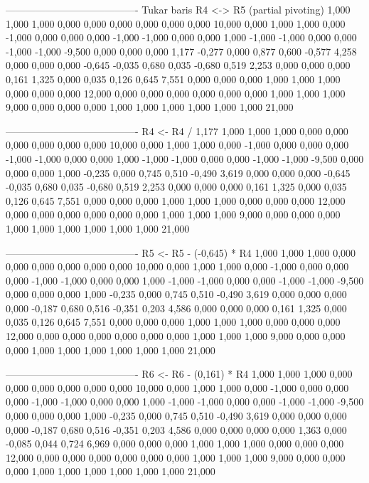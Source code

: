 \documentclass[12pt]{article}
\begin{document}
\begin{enumerate}
\begin{keluaran}
----------------------------------------
Tukar baris R4 <-> R5 (partial pivoting)
1,000   1,000   1,000   0,000   0,000   0,000   0,000   0,000   0,000   10,000
0,000   1,000   1,000   0,000   -1,000  0,000   0,000   0,000   -1,000  -1,000
0,000   0,000   1,000   -1,000  -1,000  0,000   0,000   -1,000  -1,000  -9,500
0,000   0,000   0,000   1,177   -0,277  0,000   0,877   0,600   -0,577  4,258
0,000   0,000   0,000   -0,645  -0,035  0,680   0,035   -0,680  0,519   2,253
0,000   0,000   0,000   0,161   1,325   0,000   0,035   0,126   0,645   7,551
0,000   0,000   0,000   1,000   1,000   1,000   0,000   0,000   0,000   12,000
0,000   0,000   0,000   0,000   0,000   0,000   1,000   1,000   1,000   9,000
0,000   0,000   0,000   1,000   1,000   1,000   1,000   1,000   1,000   21,000

----------------------------------------
R4 <- R4 / 1,177
1,000   1,000   1,000   0,000   0,000   0,000   0,000   0,000   0,000   10,000
0,000   1,000   1,000   0,000   -1,000  0,000   0,000   0,000   -1,000  -1,000
0,000   0,000   1,000   -1,000  -1,000  0,000   0,000   -1,000  -1,000  -9,500
0,000   0,000   0,000   1,000   -0,235  0,000   0,745   0,510   -0,490  3,619
0,000   0,000   0,000   -0,645  -0,035  0,680   0,035   -0,680  0,519   2,253
0,000   0,000   0,000   0,161   1,325   0,000   0,035   0,126   0,645   7,551
0,000   0,000   0,000   1,000   1,000   1,000   0,000   0,000   0,000   12,000
0,000   0,000   0,000   0,000   0,000   0,000   1,000   1,000   1,000   9,000
0,000   0,000   0,000   1,000   1,000   1,000   1,000   1,000   1,000   21,000

----------------------------------------
R5 <- R5 - (-0,645) * R4
1,000   1,000   1,000   0,000   0,000   0,000   0,000   0,000   0,000   10,000
0,000   1,000   1,000   0,000   -1,000  0,000   0,000   0,000   -1,000  -1,000
0,000   0,000   1,000   -1,000  -1,000  0,000   0,000   -1,000  -1,000  -9,500
0,000   0,000   0,000   1,000   -0,235  0,000   0,745   0,510   -0,490  3,619
0,000   0,000   0,000   0,000   -0,187  0,680   0,516   -0,351  0,203   4,586
0,000   0,000   0,000   0,161   1,325   0,000   0,035   0,126   0,645   7,551
0,000   0,000   0,000   1,000   1,000   1,000   0,000   0,000   0,000   12,000
0,000   0,000   0,000   0,000   0,000   0,000   1,000   1,000   1,000   9,000
0,000   0,000   0,000   1,000   1,000   1,000   1,000   1,000   1,000   21,000

----------------------------------------
R6 <- R6 - (0,161) * R4
1,000   1,000   1,000   0,000   0,000   0,000   0,000   0,000   0,000   10,000
0,000   1,000   1,000   0,000   -1,000  0,000   0,000   0,000   -1,000  -1,000
0,000   0,000   1,000   -1,000  -1,000  0,000   0,000   -1,000  -1,000  -9,500
0,000   0,000   0,000   1,000   -0,235  0,000   0,745   0,510   -0,490  3,619
0,000   0,000   0,000   0,000   -0,187  0,680   0,516   -0,351  0,203   4,586
0,000   0,000   0,000   0,000   1,363   0,000   -0,085  0,044   0,724   6,969
0,000   0,000   0,000   1,000   1,000   1,000   0,000   0,000   0,000   12,000
0,000   0,000   0,000   0,000   0,000   0,000   1,000   1,000   1,000   9,000
0,000   0,000   0,000   1,000   1,000   1,000   1,000   1,000   1,000   21,000


\end{keluaran}
\end{enumerate}
\end{document}
